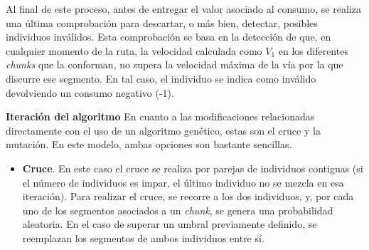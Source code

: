 \documentclass[11pt,spanish,listoffigures,listoftables]{tfgetsinf}
\begin{document}
Al final de este proceso, antes de entregar el valor asociado al consumo, se realiza una última comprobación para descartar, o más bien, detectar, posibles individuos inválidos. Esta comprobación se basa en la detección de que, en cualquier momento de la ruta, la velocidad calculada como $V_{1}$ en los diferentes \textit{chunks} que la conforman, no supera la velocidad máxima de la vía por la que discurre ese segmento. En tal caso, el individuo se indica como inválido devolviendo un consumo negativo (-1).\newline

\textbf{Iteración del algoritmo}\newline
En cuanto a las modificaciones relacionadas directamente con el uso de un algoritmo genético, estas son el cruce y la mutación. En este modelo, ambas opciones son bastante sencillas.

\begin{itemize}
    \item \textbf{Cruce}. En este caso el cruce se realiza por parejas de individuos contiguas (si el número de individuos es impar, el último individuo no se mezcla en esa iteración). Para realizar el cruce, se recorre a los dos individuos, y, por cada uno de los segmentos asociados a un \textit{chunk}, se genera una probabilidad aleatoria. En el caso de superar un umbral previamente definido, se reemplazan los segmentos de ambos individuos entre sí.
\end{itemize}
\end{document}
